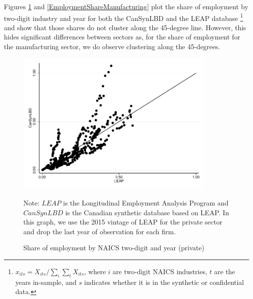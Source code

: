 \documentclass{article}
\begin{document}
Figures \ref{EmploymentSharePrivate} and \ref{EmploymentShareManufacturing} plot the share of employment by two-digit industry and year for both the CanSynLBD and the LEAP database
\footnote{$x_{its} = X_{its}/\sum_{i} \sum_{t} X_{its}$, where $i$ are two-digit NAICS industries, $t$ are the years in-sample, and $s$ indicates whether it is in the synthetic or confidential data. } and show that those shares do not cluster along the 45-degree line. However, this hides significant differences between sectors as, for the share of employment for the manufacturing sector, we do observe clustering along the 45-degrees.
\begin{figure} [H]
\centering
\caption{Share of employment by NAICS two-digit and year (private)} \label{EmploymentSharePrivate}
\includegraphics[height=2.8in, width=.7\linewidth]{graphs/Share_of_employment_by_NAICS_two-digit_and_year_private_bw.pdf} 
\begin{minipage}{0.85\textwidth}
{\footnotesize Note: $LEAP$ is the Longitudinal Employment Analysis Program and $CanSynLBD$ is the Canadian synthetic database based on LEAP. In this graph, we use the 2015 vintage of LEAP for the private sector and drop the last year of observation for each firm. \par}
\end{minipage}
\end{figure}
\vspace{-15.5pt}
\end{document}

